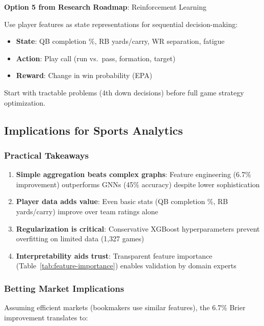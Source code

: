 \textbf{Option 5 from Research Roadmap}: Reinforcement Learning

Use player features as state representations for sequential decision-making:

\begin{itemize}
    \item \textbf{State}: QB completion \%, RB yards/carry, WR separation, fatigue
    \item \textbf{Action}: Play call (run vs.\ pass, formation, target)
    \item \textbf{Reward}: Change in win probability (EPA)
\end{itemize}

Start with tractable problems (4th down decisions) before full game strategy optimization.

\subsection{Implications for Sports Analytics}

\subsubsection{Practical Takeaways}

\begin{enumerate}
    \item \textbf{Simple aggregation beats complex graphs}: Feature engineering (6.7\% improvement) outperforms GNNs (45\% accuracy) despite lower sophistication
    \item \textbf{Player data adds value}: Even basic stats (QB completion \%, RB yards/carry) improve over team ratings alone
    \item \textbf{Regularization is critical}: Conservative XGBoost hyperparameters prevent overfitting on limited data (1,327 games)
    \item \textbf{Interpretability aids trust}: Transparent feature importance (Table~\ref{tab:feature-importance}) enables validation by domain experts
\end{enumerate}

\subsubsection{Betting Market Implications}

Assuming efficient markets (bookmakers use similar features), the 6.7\% Brier improvement translates to:


